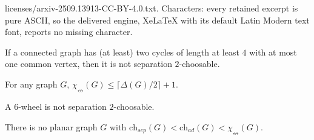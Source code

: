 \documentclass[10pt,a4paper]{amsart}
\newcommand{\ch}{\mathrm{ch}}
\newcommand{\single}{\chi_{\nleftrightarrow}}
\begin{document}
licenses/arxiv-2509.13913-CC-BY-4.0.txt. Characters: every retained excerpt is pure ASCII, so the delivered engine, XeLaTeX with its default Latin Modern text font, reports no missing character.
\begin{proposition}
\label{prop:disjointcycles}
If a connected graph has (at least) two
cycles of length at least $4$ with at most one common vertex,
 then it is 
not separation $2$-choosable.
\end{proposition}

\begin{proposition}
\label{prop:maxdeg}
	For any graph $G$, $\single(G) \leq \lceil \Delta(G)/2 \rceil +1$.
\end{proposition}

\begin{lemma}
    \label{lem:wheel}
    A $6$-wheel is not separation $2$-choosable.
\end{lemma}

\begin{theorem}
\label{prop:noplanar}
    There is no planar graph $G$ with 
    $\ch_{sep}(G) < \ch_{ad}(G) < \single(G)$.
\end{theorem}
\end{document}

